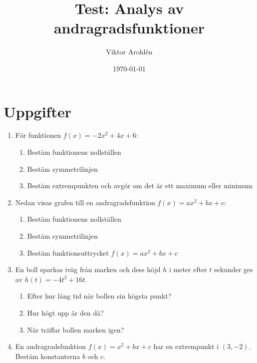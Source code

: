 \documentclass[a4paper,11pt]{article}
\title{Test: Analys av andragradsfunktioner}
\author{Viktor Arohlén}
\date{\today}
\begin{document}
\maketitle

\section*{Uppgifter}
\begin{enumerate}[label=\textbf{\arabic*.}]

    \item För funktionen $f(x) = -2x^2 + 4x + 6$:
    \begin{enumerate}[label=\alph*)]
        \item Bestäm funktionens nollställen
        \item Bestäm symmetrilinjen
        \item Bestäm extrempunkten och avgör om det är ett maximum eller minimum
    \end{enumerate}

    \item Nedan visas grafen till en andragradsfunktion $f(x) = ax^2 + bx + c$:
    \begin{center}
    \end{center}
    \begin{enumerate}[label=\alph*)]
        \item Bestäm funktionens nollställen
        \item Bestäm symmetrilinjen
        \item Bestäm funktionsuttrycket $f(x) = ax^2 + bx + c$
    \end{enumerate}

    \item En boll sparkas iväg från marken och dess höjd $h$ i meter efter $t$ sekunder ges av $h(t) = -4t^2 + 16t$.\begin{enumerate}[label=\alph*)]
        \item Efter hur lång tid når bollen sin högsta punkt?
        \item Hur högt upp är den då?
        \item När träffar bollen marken igen?
    \end{enumerate}

    \item En andragradsfunktion $f(x) = x^2 + bx + c$ har en extrempunkt i $(3, -2)$. Bestäm konstanterna $b$ och $c$.
\end{enumerate}
\end{document}
